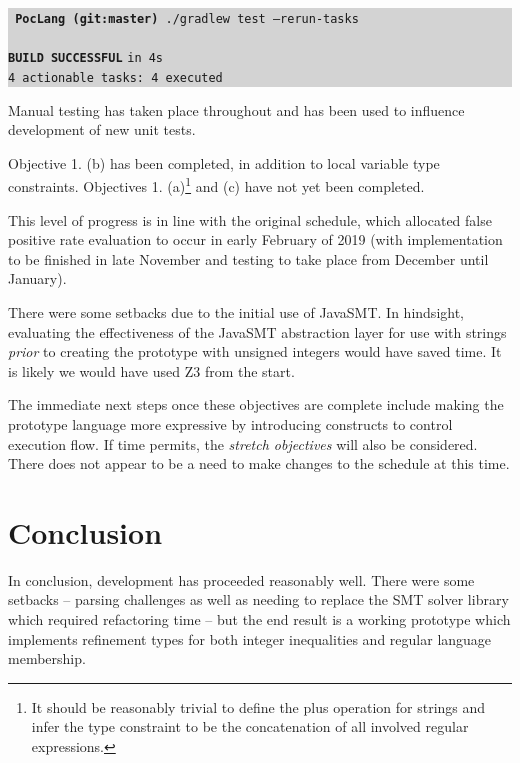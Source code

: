 \documentclass[a4paper]{article}
\newcommand{\termbox}[1] {\colorbox{lightgrey}{\parbox{\textwidth}{\vspace{.75\baselineskip}\centering\parbox{0.95\textwidth}{ \sffamily#1\vspace{.75\baselineskip}}}}}
\begin{document}
\termbox{
    \texttt{\textcolor{term-green}{} \ttfamily \textbf{\textcolor{term-dir}{PocLang} \textcolor{term-git}{(git:}\textcolor{term-branch}{master}\textcolor{term-git}{)}} ./gradlew test --rerun-tasks}\\\\

    \textcolor{term-green}{\textbf{\texttt{BUILD SUCCESSFUL}}} \texttt{in 4s}\\
    \texttt{4 actionable tasks: 4 executed}
}

Manual testing has taken place throughout and has been used to influence development of new unit tests.

Objective 1. (b) has been completed, in addition to local variable type constraints. Objectives 1. (a)\footnote{It should be reasonably trivial to define the plus operation for strings and infer the type constraint to be the concatenation of all involved regular expressions.} and (c) have not yet been completed.

This level of progress is in line with the original schedule, which allocated false positive rate evaluation to occur in early February of 2019 (with implementation to be finished in late November and testing to take place from December until January).

There were some setbacks due to the initial use of JavaSMT. In hindsight, evaluating the effectiveness of the JavaSMT abstraction layer for use with strings \emph{prior} to creating the prototype with unsigned integers would have saved time. It is likely we would have used Z3 from the start.

The immediate next steps once these objectives are complete include making the prototype language more expressive by introducing constructs to control execution flow. If time permits, the \emph{stretch objectives} will also be considered. There does not appear to be a need to make changes to the schedule at this time.


\section{Conclusion}

In conclusion, development has proceeded reasonably well. There were some setbacks -- parsing challenges as well as needing to replace the SMT solver library which required refactoring time -- but the end result is a working prototype which implements refinement types for both integer inequalities and regular language membership.
\end{document}
